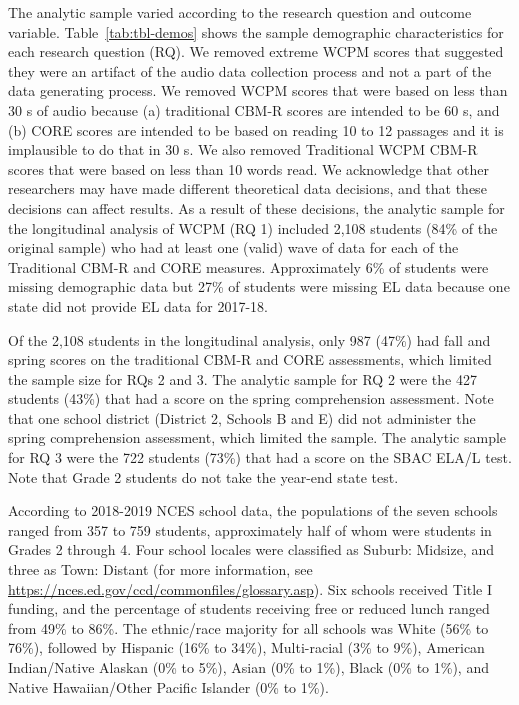 \documentclass[
  english,
  man, fleqn, noextraspace]{apa6}
\begin{document}
The analytic sample varied according to the research question and outcome variable. Table~\ref{tab:tbl-demos} shows the sample demographic characteristics for each research question (RQ). We removed extreme WCPM scores that suggested they were an artifact of the audio data collection process and not a part of the data generating process. We removed WCPM scores that were based on less than 30 s of audio because (a) traditional CBM-R scores are intended to be 60 s, and (b) CORE scores are intended to be based on reading 10 to 12 passages and it is implausible to do that in 30 s. We also removed Traditional WCPM CBM-R scores that were based on less than 10 words read. We acknowledge that other researchers may have made different theoretical data decisions, and that these decisions can affect results. As a result of these decisions, the analytic sample for the longitudinal analysis of WCPM (RQ 1) included 2,108 students (84\% of the original sample) who had at least one (valid) wave of data for each of the Traditional CBM-R and CORE measures. Approximately 6\% of students were missing demographic data but 27\% of students were missing EL data because one state did not provide EL data for 2017-18.

Of the 2,108 students in the longitudinal analysis, only 987 (47\%) had fall and spring scores on the traditional CBM-R and CORE assessments, which limited the sample size for RQs 2 and 3. The analytic sample for RQ 2 were the 427 students (43\%) that had a score on the spring comprehension assessment. Note that one school district (District 2, Schools B and E) did not administer the spring comprehension assessment, which limited the sample. The analytic sample for RQ 3 were the 722 students (73\%) that had a score on the SBAC ELA/L test. Note that Grade 2 students do not take the year-end state test.

According to 2018-2019 NCES school data, the populations of the seven schools ranged from 357 to 759 students, approximately half of whom were students in Grades 2 through 4. Four school locales were classified as Suburb: Midsize, and three as Town: Distant (for more information, see \url{https://nces.ed.gov/ccd/commonfiles/glossary.asp}). Six schools received Title I funding, and the percentage of students receiving free or reduced lunch ranged from 49\% to 86\%. The ethnic/race majority for all schools was White (56\% to 76\%), followed by Hispanic (16\% to 34\%), Multi-racial (3\% to 9\%), American Indian/Native Alaskan (0\% to 5\%), Asian (0\% to 1\%), Black (0\% to 1\%), and Native Hawaiian/Other Pacific Islander (0\% to 1\%).
\end{document}

